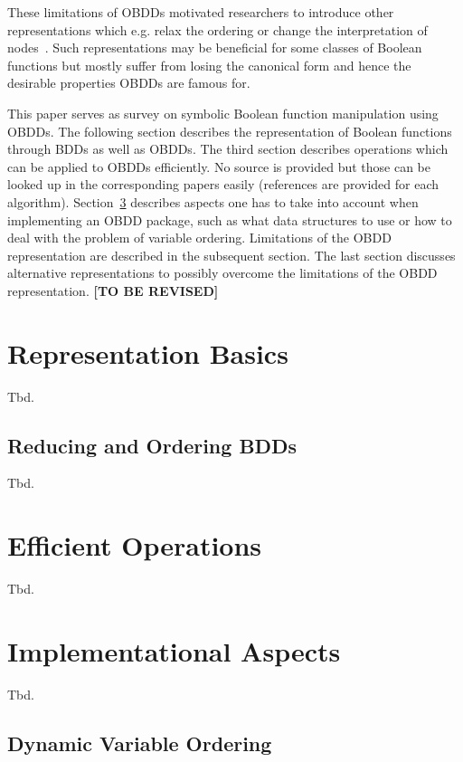 \documentclass{vldb}
\newcommand{\tbr}{\textbf{[TO BE REVISED]}}
\begin{document}
These limitations of OBDDs motivated researchers to introduce other
representations which e.g. relax the ordering or change the interpretation of
nodes~\cite{BRYANT95}. Such representations may be beneficial for some classes
of Boolean functions but mostly suffer from losing the canonical form and hence
the desirable properties OBDDs are famous for.

This paper serves as survey on symbolic Boolean function manipulation using OBDDs.
The following section describes the representation of Boolean functions through
BDDs as well as OBDDs. The third section describes operations which can be applied
to OBDDs efficiently. No source is provided but those can be looked up in the
corresponding papers easily (references are provided for each algorithm).
Section~\ref{sec:implementation-aspects} describes aspects one has to take into
account when implementing an OBDD package, such as what data structures to use
or how to deal with the problem of variable ordering. Limitations of the OBDD
representation are described in the subsequent section. The last section
discusses alternative representations to possibly overcome the limitations of
the OBDD representation.
\tbr

\section{Representation Basics}
\label{sec:representation-basics}

Tbd.

\subsection{Reducing and Ordering BDDs}
\label{subsec:reducing-and-ordering-bdds}

Tbd.

\section{Efficient Operations}
\label{sec:efficient-operations}

Tbd.

\section{Implementational Aspects}
\label{sec:implementation-aspects}

Tbd.

\subsection{Dynamic Variable Ordering}
\label{subsec:dynamic-variable-ordering}
\end{document}
